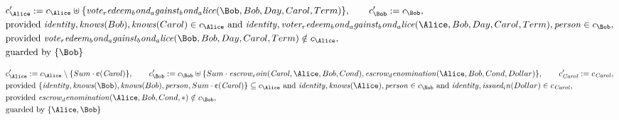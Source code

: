 \fi
\begin{align*}
&
c'_
{
\Alice
}
 := 
c_
{
\Alice
}
 \uplus 
\{
\mathit{
vote_redeem_bond_against_bond_alice
}
(
\Bob
,
Bob
,
Day
,
Carol
,
Term
)
\}
, \qquad 
c'_
{
\Bob
}
 := 
c_
{
\Bob
}
,\\
&
\text{provided } 
\mathit{
identity
}
,
\mathit{
knows
}
(
Bob
)
,
\mathit{
knows
}
(
Carol
)
 \in c_
{
\Alice
}
 \text{ and } 
\mathit{
identity
}
,
\mathit{
voter_redeem_bond_against_bond_alice
}
(
\Alice
,
Bob
,
Day
,
Carol
,
Term
)
,
\mathit{
person
}
 \in c_
{
\Bob
}
,\\
&
\text{provided } 
\mathit{
vote_redeem_bond_against_bond_alice
}
(
\Bob
,
Bob
,
Day
,
Carol
,
Term
)
 \notin c_
{
\Alice
}
,\\
&
\text{guarded by } \{
\Bob
\}
\end{align*}

\begin{align*}
&
c'_
{
\Alice
}
 := 
c_
{
\Alice
}
 \setminus 
\{
Sum
\cdot
\text{\textcent}
(
\mathit{Carol}
)
\}
, \qquad 
c'_
{
\Bob
}
 := 
c_
{
\Bob
}
 \uplus 
\{
Sum
\cdot
\mathit{
escrow_coin
}
(
\mathit{Carol}
,
\Alice
,
Bob
,
Cond
)
,
\mathit{
escrow_denomination
}
(
\Alice
,
Bob
,
Cond
,
Dollar
)
\}
, \qquad 
c'_
{
\mathit{Carol}
}
 := 
c_
{
\mathit{Carol}
}
,\\
&
\text{provided } 
\{
\mathit{
identity
}
,
\mathit{
knows
}
(
\Bob
)
,
\mathit{
knows
}
(
Bob
)
,
\mathit{
person
}
,
Sum
\cdot
\text{\textcent}
(
\mathit{Carol}
)
\}
 \subseteq c_
{
\Alice
}
 \text{ and } 
\mathit{
identity
}
,
\mathit{
knows
}
(
\Alice
)
,
\mathit{
person
}
 \in c_
{
\Bob
}
 \text{ and } 
\mathit{
identity
}
,
\mathit{
issued_in
}
(
Dollar
)
 \in c_
{
\mathit{Carol}
}
,\\
&
\text{provided } 
\mathit{
escrow_denomination
}
(
\Alice
,
Bob
,
Cond
,
\ast
)
 \notin c_
{
\Bob
}
,\\
&
\text{guarded by } \{
\Alice
,
\Bob
\}
\end{align*}

